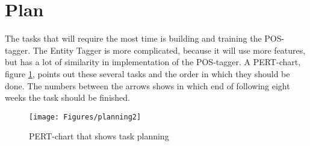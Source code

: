 \documentclass{article}
\begin{document}
\section{Plan}
The tasks that will require the most time is building and training the POS-tagger. The Entity Tagger is more complicated, because it will use more features, but has a lot of similarity in implementation of the POS-tagger. A PERT-chart, figure \ref{fig:planning}, points out these several tasks and the order in which they should be done. The numbers between the arrows shows in which end of following eight weeks the task should be finished.

\begin{figure}[!h]
    \centering
    \texttt{[image: Figures/planning2]}
    \caption{PERT-chart that shows task planning}
    \label{fig:planning}
\end{figure}


\clearpage


\end{document}
